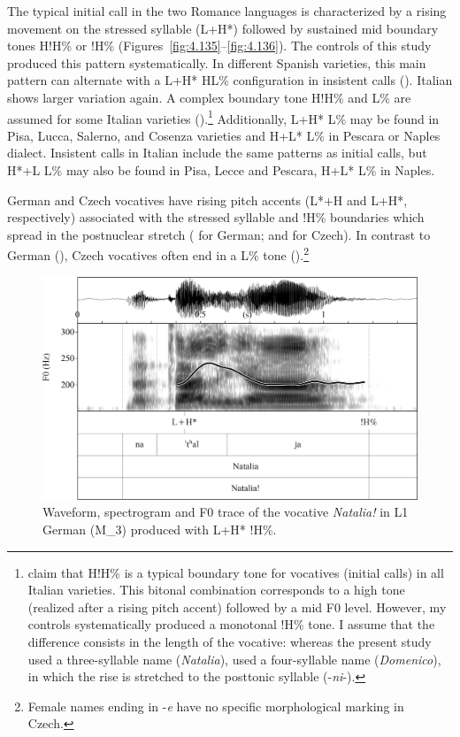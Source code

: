 The typical initial call in the two Romance languages is characterized by a rising movement on the stressed syllable (L+H*) followed by sustained mid boundary tones H!H\% or  !H\% (Figures~\ref{fig:4.135}--\ref{fig:4.136}). The controls of this study produced this pattern systematically. In different Spanish varieties, this main pattern can alternate with a L+H* HL\% configuration in insistent calls (\citealt{PrietoRoseano2010}). Italian shows larger variation again. A complex boundary tone H!H\% and L\% are assumed for some Italian varieties (\citealt{GiliFivelaEtAl2015}).\footnote{\citet{GiliFivelaEtAl2015} claim that H!H\% is a typical boundary tone for vocatives (initial calls) in all Italian varieties. This bitonal combination corresponds to a high tone (realized after a rising pitch accent) followed by a mid F0 level. However, my controls systematically produced a monotonal !H\% tone. I assume that the difference consists in the length of the vocative: whereas the present study used a three-syllable name (\textit{Natalia}), \citet{GiliFivelaEtAl2015} used a four-syllable name (\textit{Domenico}), in which the rise is stretched to the posttonic syllable (-\textit{ni}{}-).} Additionally, L+H* L\% may be found in Pisa, Lucca, Salerno, and Cosenza varieties and H+L* L\% in Pescara or Naples dialect. Insistent calls in Italian include the same patterns as initial calls, but H*+L L\% may also be found in Pisa, Lecce and Pescara, H+L* L\% in Naples.



German and Czech vocatives have rising pitch accents (L*+H and L+H*, respectively) associated with the stressed syllable and !H\% boundaries which spread in the postnuclear stretch (\citealt{Grabe1998, Niebuhr2015} for German; \citealt{Pešková2019} and \citealt{PeškováForthcoming} for Czech). In contrast to German (), Czech vocatives often end in a L\% tone ().\footnote{Female names ending in -\textit{e} have no specific morphological marking in Czech.}


\begin{figure}
\includegraphics[width=\textwidth]{figures/Figure_4.137.png}
\caption{Waveform, spectrogram and F0 trace of the vocative \textit{Natalia!} in L1 German (M\_3) produced with L+H* !H\%.}
\label{fig:4.137}
\end{figure}

